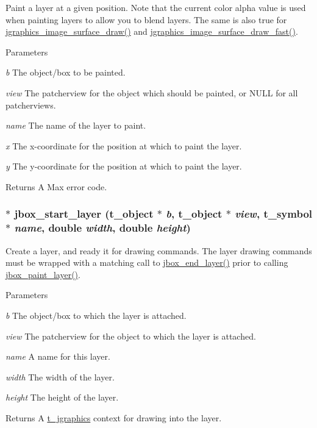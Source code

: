 Paint a layer at a given position. Note that the current color alpha value is used when painting layers to allow you to blend layers. The same is also true for \hyperlink{group__jsurface_gab6b97ae8202c210ccec29ec2b8c4f5d0}{jgraphics\_\-image\_\-surface\_\-draw()} and \hyperlink{group__jsurface_ga766ec5ca1b93fa9b0f3b05c49122f62c}{jgraphics\_\-image\_\-surface\_\-draw\_\-fast()}.


\begin{DoxyParams}{Parameters}
\item[{\em b}]The object/box to be painted. \item[{\em view}]The patcherview for the object which should be painted, or NULL for all patcherviews. \item[{\em name}]The name of the layer to paint. \item[{\em x}]The x-\/coordinate for the position at which to paint the layer. \item[{\em y}]The y-\/coordinate for the position at which to paint the layer. \end{DoxyParams}
\begin{DoxyReturn}{Returns}
A Max error code. 
\end{DoxyReturn}
\hypertarget{group__boxlayer_ga9a6684193d5b946f1e61afebf603ad9c}{
\subsubsection[{jbox\_\-start\_\-layer}]{$\ast$ jbox\_\-start\_\-layer ({\bf t\_\-object} $\ast$ {\em b}, \/  {\bf t\_\-object} $\ast$ {\em view}, \/  {\bf t\_\-symbol} $\ast$ {\em name}, \/  double {\em width}, \/  double {\em height})}}
\label{group__boxlayer_ga9a6684193d5b946f1e61afebf603ad9c}


Create a layer, and ready it for drawing commands. The layer drawing commands must be wrapped with a matching call to \hyperlink{group__boxlayer_gae8607b453997030d7bc252b40d066884}{jbox\_\-end\_\-layer()} prior to calling \hyperlink{group__boxlayer_ga87b03b3d160e3a798c7f799773e68750}{jbox\_\-paint\_\-layer()}.


\begin{DoxyParams}{Parameters}
\item[{\em b}]The object/box to which the layer is attached. \item[{\em view}]The patcherview for the object to which the layer is attached. \item[{\em name}]A name for this layer. \item[{\em width}]The width of the layer. \item[{\em height}]The height of the layer. \end{DoxyParams}
\begin{DoxyReturn}{Returns}
A \hyperlink{group__jgraphics_ga4bf27bd7e21a59a427481b909d4656e7}{t\_\-jgraphics} context for drawing into the layer. 
\end{DoxyReturn}
